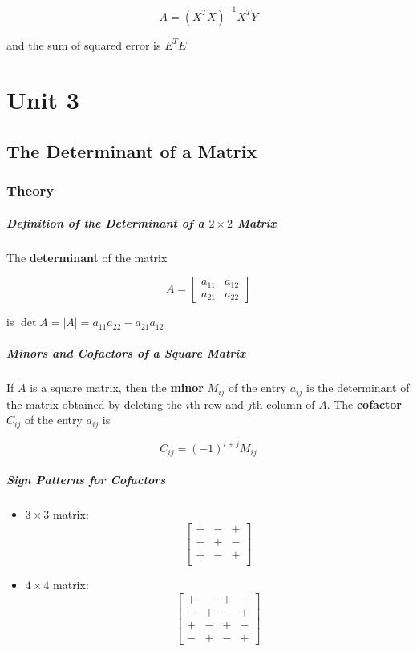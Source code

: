 \documentclass{report}
\begin{document}
$$
A = \left( X^TX \right)^{-1} X^T Y
$$

\noindent and the sum of squared error is $E^T E$

\chapter{Unit 3}

\section{The Determinant of a Matrix}

\subsection{Theory}

\paragraph{Definition of the Determinant of a $2 \times 2$ Matrix} The \textbf{determinant} of the matrix

\[
A
=
\begin{bmatrix}
    a_{11} & a_{12} \\
    a_{21} & a_{22}
\end{bmatrix}
\]

\noindent is $\det{A} = | A | = a_{11}a_{22} - a_{21}a_{12}$

\paragraph{Minors and Cofactors of a Square Matrix} If $A$ is a square matrix, then the \textbf{minor} $M_{ij}$ of the entry $a_{ij}$ is the determinant of the matrix obtained by deleting the $i$th row and $j$th column of $A$. The \textbf{cofactor} $C_{ij}$ of the entry $a_{ij}$ is 

$$
C_{ij} = (-1)^{i+j} M_{ij}
$$

\paragraph{Sign Patterns for Cofactors}

\begin{itemize}
    \item $3 \times 3$ matrix:
    \[
    \begin{bmatrix}
        + & - & + \\
        - & + & - \\
        + & - & + \\
    \end{bmatrix}
    \]

    \item $4 \times 4$ matrix:
    \[
    \begin{bmatrix}
        + & - & + & - \\
        - & + & - & + \\
        + & - & + & - \\
        - & + & - & + 
    \end{bmatrix}
    \]
\end{itemize}
\end{document}
